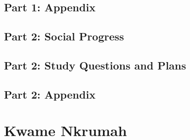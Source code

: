 \documentclass[12pt, letterpaper]{article}
\begin{document}
\subsection{Part 1: Appendix}



\subsection{Part 2: Social Progress}

\subsection{Part 2: Study Questions and Plans}

\subsection{Part 2: Appendix}



\newpage
\section{Kwame Nkrumah}
\end{document}
